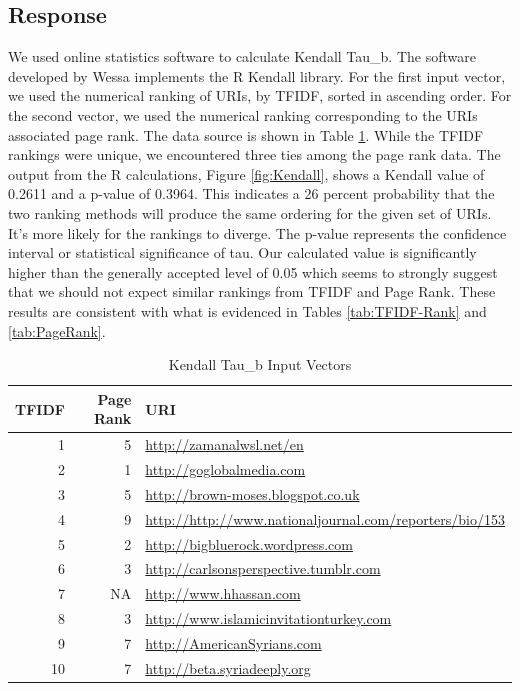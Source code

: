 \documentclass[letterpaper,11pt]{report}
\begin{document}
\begin{savenotes}
\subsection{Response}We used online statistics software to calculate Kendall Tau\_b. The software developed by Wessa\cite{Wessa2012} implements the R Kendall library. For the first input vector, we used the numerical ranking of URIs, by TFIDF, sorted in ascending order. For the second vector, we used the numerical ranking corresponding to the URIs associated page rank. The data source is shown in Table \ref{tab:Kendall}. While the TFIDF rankings were unique, we encountered three ties among the page rank data. The output from the R calculations, Figure \ref{fig:Kendall}, shows a Kendall value of 0.2611 and a p-value of 0.3964. This indicates a 26 percent probability that the two ranking methods will produce the same ordering for the given set of URIs. It's more likely for the rankings to diverge. The p-value represents the confidence interval or statistical significance of tau. Our calculated value is significantly higher than the generally accepted level of 0.05 which seems to strongly suggest that we should not expect similar rankings from TFIDF and Page Rank. These results are consistent with what is evidenced in Tables \ref{tab:TFIDF-Rank} and \ref{tab:PageRank}.


\begin{table}
	\centering
    \begin{tabular}{|r|r|l|}
    \hline
    TFIDF 	& Page Rank     & URI                            \\ \hline
    1				& 5 	& \url{http://zamanalwsl.net/en}                 \\ \hline
    2				& 1 	& \url{http://goglobalmedia.com}              \\ \hline
    3				& 5 	& \url{http://brown-moses.blogspot.co.uk}     \\ \hline		
    4				& 9 	& \url{http://http://www.nationaljournal.com/reporters/bio/153}        \\ \hline
    5				& 2 	& \url{http://bigbluerock.wordpress.com}      \\ \hline						
    6				& 3 	& \url{http://carlsonsperspective.tumblr.com} \\ \hline
    7				& NA 	& \url{http://www.hhassan.com}                \\ \hline
    8				& 3 	& \url{http://www.islamicinvitationturkey.com} \\ \hline				
	  9				& 7 	& \url{http://AmericanSyrians.com}            \\ \hline
		10			& 7 	& \url{http://beta.syriadeeply.org}           \\ \hline
    \end{tabular}
    \caption {Kendall Tau\_b Input Vectors}
			\label{tab:Kendall}
\end{table}



\end{savenotes}
\end{document}
